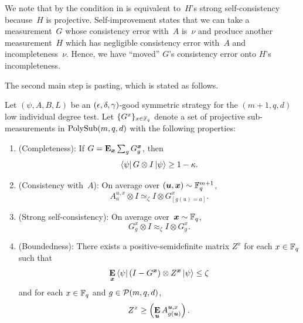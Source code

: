 We note that by  the condition in 
is equivalent to~$H$'s strong self-consistency because~$H$ is projective.
Self-improvement states that we can take a measurement~$G$
whose consistency error with~$A$ is~$\nu$
and produce another measurement~$H$
which has negligible consistency error with~$A$
and incompleteness~$\nu$.
Hence, we have ``moved'' $G$'s consistency error onto $H$'s incompleteness.

The second main step is pasting, which is stated as follows.

\begin{theorem}[Pasting]\label{thm:ld-pasting-in-induction-section}
  Let $(\psi, A, B, L)$ be an $(\epsilon, \delta, \gamma)$-good symmetric strategy for the $(m+1,q,d)$ low individual degree test.
  Let $\{G^x\}_{x \in \mathbb F_q}$ denote a set of projective sub-measurements in $\mathrm{PolySub}(m, q, d)$ with the following properties:
  \begin{enumerate}
  \item (Completeness): \label{item:ld-pasting-inductive-completeness}  If $G = \mathop{\bf E\/}_{{\boldsymbol{x}}} \sum_g G^{{\boldsymbol{x}}}_g$, then
  	\begin{equation*}
	\bra{\psi} G \otimes I \ket{\psi} \geq 1 - \kappa.
	\end{equation*}
  \item (Consistency with~$A$): \label{item:ld-pasting-inductive-consistency} On average over $(\boldsymbol{u}, {\boldsymbol{x}}) \sim \mathbb F_q^{m+1}$,
	  \begin{equation*}
	  A^{u, x}_a \otimes I \simeq_{\zeta} I \otimes G^x_{[g(u)=a]}.
	  \end{equation*}
  \item (Strong self-consistency): \label{item:ld-pasting-inductive-self-consistency} On average over~${\boldsymbol{x}} \sim \mathbb F_q$,
  	\begin{equation*}
		G^x_g \otimes I \approx_{\zeta} I \otimes G^x_g.
	\end{equation*}
  \item (Boundedness): \label{item:ld-pasting-inductive-boundedness} There exists a positive-semidefinite matrix $Z^x$ for each $x \in \mathbb F_q$ such that
  	\begin{equation*}
		\mathop{\bf E\/}_{{\boldsymbol{x}}} \bra{\psi} (I-G^{{\boldsymbol{x}}})\otimes Z^{{\boldsymbol{x}}} \ket{\psi} \leq \zeta
	\end{equation*}
	and for each $x \in \mathbb F_q$ and $g \in \mathcal{P}(m, q, d)$,
	\begin{equation*}
	Z^x \geq \left(\mathop{\bf E\/}_{\boldsymbol{u}} A^{\boldsymbol{u}, x}_{g(\boldsymbol{u})}\right).
	\end{equation*}

\end{enumerate}
\end{theorem}
